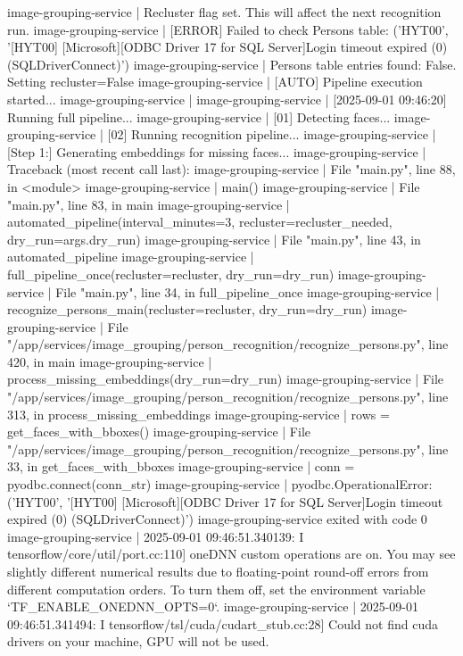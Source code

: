 image-grouping-service  | Recluster flag set. This will affect the next recognition run.
image-grouping-service  | [ERROR] Failed to check Persons table: ('HYT00', '[HYT00] [Microsoft][ODBC Driver 17 for SQL Server]Login timeout expired (0) (SQLDriverConnect)')
image-grouping-service  | Persons table entries found: False. Setting recluster=False
image-grouping-service  | [AUTO] Pipeline execution started...
image-grouping-service  |
image-grouping-service  | [2025-09-01 09:46:20] Running full pipeline...
image-grouping-service  | [01] Detecting faces...
image-grouping-service  | [02] Running recognition pipeline...
image-grouping-service  | [Step 1:] Generating embeddings for missing faces...
image-grouping-service  | Traceback (most recent call last):
image-grouping-service  |   File "main.py", line 88, in <module>
image-grouping-service  |     main()
image-grouping-service  |   File "main.py", line 83, in main
image-grouping-service  |     automated_pipeline(interval_minutes=3, recluster=recluster_needed, dry_run=args.dry_run)
image-grouping-service  |   File "main.py", line 43, in automated_pipeline
image-grouping-service  |     full_pipeline_once(recluster=recluster, dry_run=dry_run)
image-grouping-service  |   File "main.py", line 34, in full_pipeline_once
image-grouping-service  |     recognize_persons_main(recluster=recluster, dry_run=dry_run)
image-grouping-service  |   File "/app/services/image_grouping/person_recognition/recognize_persons.py", line 420, in main
image-grouping-service  |     process_missing_embeddings(dry_run=dry_run)
image-grouping-service  |   File "/app/services/image_grouping/person_recognition/recognize_persons.py", line 313, in process_missing_embeddings
image-grouping-service  |     rows = get_faces_with_bboxes()
image-grouping-service  |   File "/app/services/image_grouping/person_recognition/recognize_persons.py", line 33, in get_faces_with_bboxes
image-grouping-service  |     conn = pyodbc.connect(conn_str)
image-grouping-service  | pyodbc.OperationalError: ('HYT00', '[HYT00] [Microsoft][ODBC Driver 17 for SQL Server]Login timeout expired (0) (SQLDriverConnect)')
image-grouping-service exited with code 0
image-grouping-service  | 2025-09-01 09:46:51.340139: I tensorflow/core/util/port.cc:110] oneDNN custom operations are on. You may see slightly different numerical results due to floating-point round-off errors from different computation orders. To turn them off, set the environment variable `TF_ENABLE_ONEDNN_OPTS=0`.
image-grouping-service  | 2025-09-01 09:46:51.341494: I tensorflow/tsl/cuda/cudart_stub.cc:28] Could not find cuda drivers on your machine, GPU will not be used.
